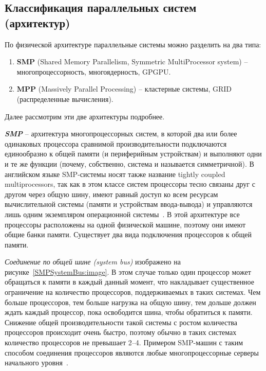 \subsection{Классификация параллельных систем (архитектур)}

По физической архитектуре параллельные системы можно разделить на два типа:

\begin{enumerate}
    \item\textbf{SMP} (Shared Memory Parallelism, Symmetric MultiProcessor system) -- многопроцессорность, многоядерность, GPGPU\@. 
    \item\textbf{MPP} (Massively Parallel Processing) -- кластерные системы, GRID (распределенные вычисления).
\end{enumerate}

Далее рассмотрим эти две архитектуры подробнее.

\textbf{\textit{SMP}} -- архитектура многопроцессорных систем, в которой два или более одинаковых процессора сравнимой производительности подключаются единообразно к общей памяти (и периферийным устройствам) и выполняют одни и те же функции (почему, собственно, система и называется симметричной).
В английском языке SMP-системы носят также название tightly coupled multiprocessors, так как в этом классе систем процессоры тесно связаны друг с другом через общую шину, имеют равный доступ ко всем ресурсам вычислительной системы (памяти и устройствам ввода-вывода) и управляются лишь одним экземпляром операционной системы~\cite{SymmetricMultiprocessingWP}.
В этой архитектуре все процессоры расположены на одной физической машине, поэтому они имеют общие банки памяти.
Существует два вида подключения процессоров к общей памяти.

\textit{Соединение по общей шине (system bus)} изображено на рисунке~\ref{SMPSystemBus:image}.
В этом случае только один процессор может обращаться к памяти в каждый данный момент, что накладывает существенное ограничение на количество процессоров, поддерживаемых в таких системах.
Чем больше процессоров, тем больше нагрузка на общую шину, тем дольше должен ждать каждый процессор, пока освободится шина, чтобы обратиться к памяти.
Снижение общей производительности такой системы с ростом количества процессоров происходит очень быстро, поэтому обычно в таких системах количество процессоров не превышает 2--4.
Примером SMP-машин с таким способом соединения процессоров являются любые многопроцессорные серверы начального уровня~\cite{Martyshkin2014}.

